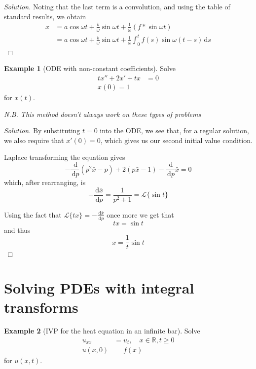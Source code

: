 \documentclass[10pt,fleqn]{article}
\newcommand{\diff}{\,\mathrm{d}}
\newcommand{\reals}{\mathbb{R}}
\theoremstyle{definition} \newtheorem{defn}{Definition}[section]
\theoremstyle{plain}      \newtheorem{thm}[defn]{Theorem}
\theoremstyle{plain}      \newtheorem{lem}[defn]{Lemma}
\theoremstyle{definition} \newtheorem{prop}[defn]{Proposition}
\theoremstyle{definition} \newtheorem{cor}[defn]{Corollary}
\theoremstyle{definition} \newtheorem{ex}[defn]{Example}
\theoremstyle{definition} \newtheorem{rem}[defn]{Remark}
\begin{document}
{\begin{proof}[Solution]
    Noting that the last term is a convolution, and using the table of standard results, we obtain
    \begin{align*}
        x
        &=
        a\cos\omega t+\frac{b}{\omega}\sin\omega t+\frac{1}{\omega}(f*\sin\omega t)\\
        &=
        a\cos\omega t+\frac{b}{\omega}\sin\omega t+\frac{1}{\omega}\int_0^t f(s)\sin\omega(t-s)\diff s
    \end{align*}
\end{proof}

\begin{ex}[ODE with non-constant coefficients]
    Solve
    \begin{align*}
        tx''+2x'+tx&=0\\
        x(0)=1
    \end{align*}
    for $x(t)$.
\end{ex}

\emph{N.B. This method doesn't always work on these types of problems}

\begin{proof}[Solution]
    By substituting $t=0$ into the ODE, we see that, for a regular solution, we also require that $x'(0)=0$, which gives us our second initial value condition.

    Laplace transforming the equation gives
    \[
        -\frac{\diff}{\diff p}(p^2\bar{x}-p)+2(p\bar{x}-1)-\frac{\diff}{\diff p}\bar{x}=
        0
    \]
    which, after rearranging, is
    \[
        -\frac{\diff\bar{x}}{\diff p}=
        \frac{1}{p^2+1}=
        \mathcal{L}\{\sin t\}
    \]

    Using the fact that $\mathcal{L}\{tx\}=-\frac{\diff\bar{x}}{\diff p}$ once more we get that
    \[
        tx=\sin t
    \]
    and thus
    \[
        x=\frac{1}{t}\sin t
    \]
\end{proof}


\section{Solving PDEs with integral transforms}

\begin{ex}[IVP for the heat equation in an infinite bar]
    Solve
    \begin{align*}
        u_{xx}&=u_t,\quad x\in\reals,t\geq0\\
        u(x,0)&=f(x)
    \end{align*}
    for $u(x,t)$.
\end{ex}

}
\end{document}
